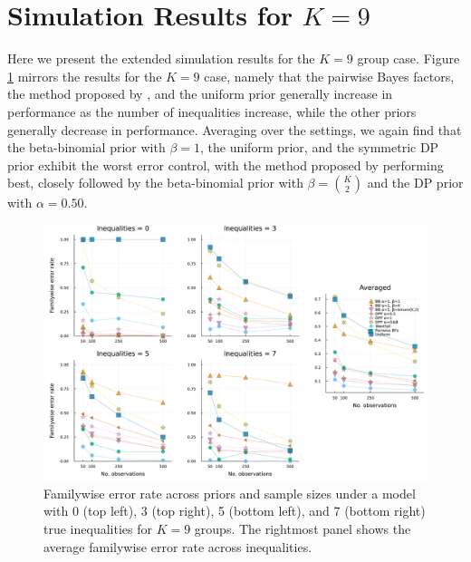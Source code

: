 \documentclass[11pt,a4paper]{article}
\theoremstyle{definition} %
\theoremstyle{case}
\begin{document}
\section{Simulation Results for $K = 9$} \label{app:simulation}
Here we present the extended simulation results for the $K = 9$ group case. Figure \ref{fig:big_simulation-k9-I} mirrors the results for the $K = 9$ case, namely that the pairwise Bayes factors, the method proposed by \textcite{westfall1997bayesian}, and the uniform prior generally increase in performance as the number of inequalities increase, while the other priors generally decrease in performance. Averaging over the settings, we again find that the beta-binomial prior with $\beta = 1$, the uniform prior, and the symmetric DP prior exhibit the worst error control, with the method proposed by \textcite{westfall1997bayesian} performing best, closely followed by the beta-binomial prior with $\beta = {K \choose 2}$ and the DP prior with $\alpha = 0.50$.

\begin{figure}[!h]
    \centering
    \includegraphics[width=1\textwidth]{subset_k_9_alpha_familywise.pdf}
    \caption{Familywise error rate across priors and sample sizes under a model with 0 (top left), 3 (top right), 5 (bottom left), and 7 (bottom right) true inequalities for $K = 9$ groups. The rightmost panel shows the average familywise error rate across inequalities.}
    \label{fig:big_simulation-k9-I}
\end{figure}
\end{document}
